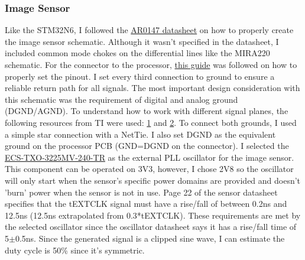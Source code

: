 \documentclass[10pt]{article}
\newcommand{\nl}{\newline \newline}
\begin{document}
\subsubsection{Image Sensor} \label{sec:schematic-sensor}
Like the STM32N6, I followed the \href{https://edit.wpgdadawant.com/uploads/news_file/program/2021/36761/tech_files/program_36761_suggest_other_file.PDF?}{AR0147 datasheet} on how to properly create the image sensor schematic.
Although it wasn't specified in the datasheet, I included common mode chokes on the differential lines like the MIRA220 schematic.
\nl
For the connector to the processor, \href{https://blog.arducam.com/raspberry-pi-camera/connector-type-pinout/}{this guide} was followed on how to properly set the pinout. I set every third connection to ground to ensure a reliable return path for all signals.
\nl
The most important design consideration with this schematic was the requirement of digital and analog ground (DGND/AGND). To understand how to work with different signal planes, the following resources from TI were used: \href{https://www.ti.com/lit/an/slyt499/slyt499.pdf?ts=1756814995128&ref_url=https%3A%2F%2Fwww.google.com%2F}{1} and \href{https://www.ti.com/lit/an/slyt512/slyt512.pdf?ts=1756824651700&ref_url=https%3A%2F%2Fwww.google.com%2F}{2}.
To connect both grounds, I used a simple star connection with a NetTie. I also set DGND as the equivalent ground on the processor PCB (GND=DGND on the connector).
\nl
I selected the \href{https://au.mouser.com/ProductDetail/ECS/ECS-TXO-3225MV-240-TR?qs=d0WKAl%252BL4KYXn7UuwSFJGQ%3D%3D&srsltid=AfmBOoqlFJCYyqd6MzLT63_Pw_wqXWR5Bv4SHlYdyhoVLS8l8SGV9TkK}{ECS-TXO-3225MV-240-TR} as the external PLL oscillator for the image sensor. This component can be operated on 3V3, however, I chose 2V8 so the oscillator will only start when the sensor's specific power domains are provided and doesn't 'burn' power when the sensor is not in use.
Page 22 of the sensor datasheet specifies that the tEXTCLK signal must have a rise/fall of between 0.2ns and 12.5ns (12.5ns extrapolated from 0.3*tEXTCLK). These requirements are met by the selected oscillator since the oscillator datasheet says it has a rise/fall time of 5$\pm$0.5ns. Since the generated signal is a clipped sine wave, I can estimate the duty cycle is 50\% since it's symmetric.

\end{document}
